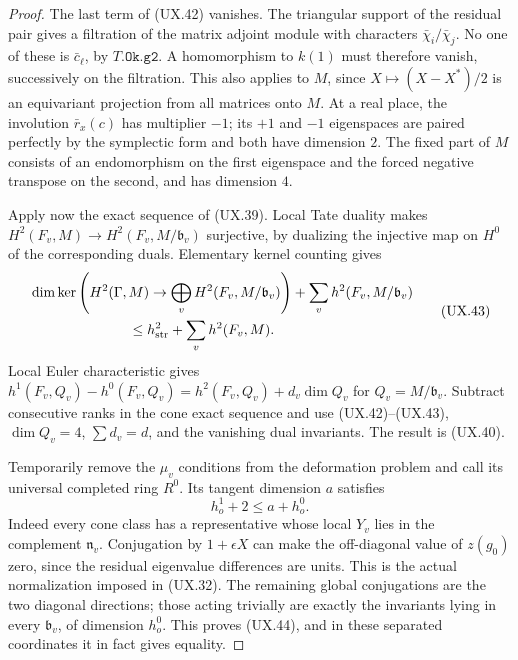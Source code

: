 \begin{proof}
The last term of (UX.42) vanishes.  The
triangular support of the residual pair
gives a filtration of the matrix adjoint
module with characters $\bar\chi_i/\bar\chi_j$.
No one of these is $\bar c_\ell$, by
$T.\mathtt{Ok.g2}$.  A homomorphism to
$k(1)$ must therefore vanish, successively
on the filtration.  This also applies
to $M$, since
$X\mapsto(X-X^*)/2$ is an equivariant
projection from all matrices onto $M$.
At a real place, the involution $\bar r_x(c)$
has multiplier $-1$; its $+1$ and $-1$
eigenspaces are paired perfectly by the
symplectic form and both have dimension $2$.
The fixed part of $M$ consists of an
endomorphism on the first eigenspace and
the forced negative transpose on the second,
and has dimension $4$.

Apply now the exact sequence of (UX.39).
Local Tate duality makes
$H^2(F_v,M)\to H^2(F_v,M/\mathfrak b_v)$
surjective, by dualizing the injective
map on $H^0$ of the corresponding duals.
Elementary kernel counting gives
\[
 \begin{split}
 &\dim\ker\left(H^2(\Gamma,M)\to
             \bigoplus_vH^2(F_v,M/\mathfrak b_v)\right)
            +\sum_vh^2(F_v,M/\mathfrak b_v)\\
 &\hspace{25mm}\le
 h^2_{\rm str}+\sum_vh^2(F_v,M).
 \end{split}
 \tag{UX.43}
\]
Local Euler characteristic gives
$h^1(F_v,Q_v)-h^0(F_v,Q_v)
 =h^2(F_v,Q_v)+d_v\dim Q_v$
for $Q_v=M/\mathfrak b_v$.  Subtract consecutive
ranks in the cone exact sequence and use
(UX.42)--(UX.43), $\dim Q_v=4$,
$\sum d_v=d$, and the vanishing dual
invariants.  The result is (UX.40).

Temporarily remove the $\mu_v$ conditions
from the deformation problem and call its
universal completed ring $R^0$.  Its
tangent dimension $a$ satisfies
\[
                     h^1_o+2\le a+h^0_o.
 \tag{UX.44}
\]
Indeed every cone class has a representative
whose local $Y_v$ lies in the complement
$\mathfrak n_v$.  Conjugation by $1+\epsilon X$
can make the off-diagonal value of $z(g_0)$
zero, since the residual eigenvalue
differences are units.  This is the actual
normalization imposed in (UX.32).
The remaining global conjugations are the
two diagonal directions; those acting
trivially are exactly the invariants lying
in every $\mathfrak b_v$, of dimension $h^0_o$.
This proves (UX.44), and in these separated
coordinates it in fact gives equality.


\end{proof}
